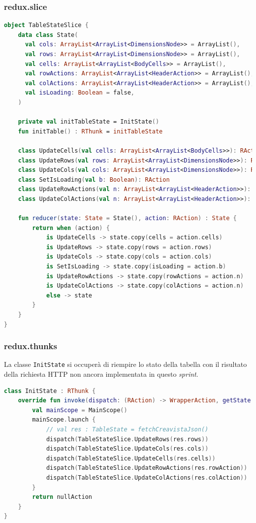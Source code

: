 \subsubsection{redux.slice}
\begin{lstlisting}[caption={TableStateSlice}, label={lst:tablestateslice}, language=Kotlin]
object TableStateSlice {
	data class State(
	  val cols: ArrayList<ArrayList<DimensionsNode>> = ArrayList(),
	  val rows: ArrayList<ArrayList<DimensionsNode>> = ArrayList(),
	  val cells: ArrayList<ArrayList<BodyCells>> = ArrayList(),
	  val rowActions: ArrayList<ArrayList<HeaderAction>> = ArrayList(),
	  val colActions: ArrayList<ArrayList<HeaderAction>> = ArrayList(),
	  val isLoading: Boolean = false,
	)
	
	private val initTableState = InitState()
	fun initTable() : RThunk = initTableState
	
	class UpdateCells(val cells: ArrayList<ArrayList<BodyCells>>): RAction
	class UpdateRows(val rows: ArrayList<ArrayList<DimensionsNode>>): RAction
	class UpdateCols(val cols: ArrayList<ArrayList<DimensionsNode>>): RAction
	class SetIsLoading(val b: Boolean): RAction
	class UpdateRowActions(val n: ArrayList<ArrayList<HeaderAction>>): RAction
	class UpdateColActions(val n: ArrayList<ArrayList<HeaderAction>>): RAction
	
	fun reducer(state: State = State(), action: RAction) : State {
		return when (action) {
			is UpdateCells -> state.copy(cells = action.cells)
			is UpdateRows -> state.copy(rows = action.rows)
			is UpdateCols -> state.copy(cols = action.cols)
			is SetIsLoading -> state.copy(isLoading = action.b)
			is UpdateRowActions -> state.copy(rowActions = action.n)
			is UpdateColActions -> state.copy(colActions = action.n)
			else -> state
		}
	}
}
\end{lstlisting}

\subsubsection{redux.thunks}
La classe \verb|InitState| si occuperà di riempire lo stato della tabella con il risultato della richiesta HTTP non ancora implementata in questo \emph{sprint}.
\begin{lstlisting}[caption={InitState}, label={lst:initState}, language=Kotlin]
class InitState : RThunk {
	override fun invoke(dispatch: (RAction) -> WrapperAction, getState: () -> AppState): WrapperAction {
		val mainScope = MainScope()
		mainScope.launch {
			// val res : TableState = fetchCreavistaJson()
			dispatch(TableStateSlice.UpdateRows(res.rows))
			dispatch(TableStateSlice.UpdateCols(res.cols))
			dispatch(TableStateSlice.UpdateCells(res.cells))
			dispatch(TableStateSlice.UpdateRowActions(res.rowAction))
			dispatch(TableStateSlice.UpdateColActions(res.colAction))
		}
		return nullAction
	}
}
\end{lstlisting}

